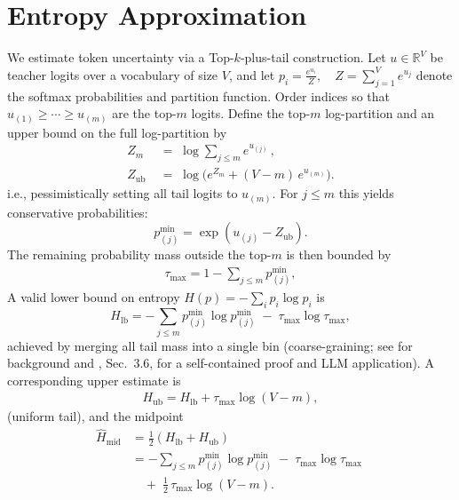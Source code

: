 \documentclass[11pt]{article}
\begin{document}
\section{Entropy Approximation}
\label{sec:entropy}
We estimate token uncertainty via a Top-$k$-plus-tail construction. Let $u \in \mathbb{R}^V$ be teacher logits over a vocabulary of size $V$, and let
$
	p_i=\frac{e^{u_i}}{Z},\quad Z=\sum_{j=1}^V e^{u_j}
$
denote the softmax probabilities and partition function. Order indices so that $u_{(1)} \geq \cdots \geq u_{(m)}$ are the top-$m$ logits. Define the top-$m$ log-partition and an upper bound on the full log-partition by
\begin{align*}
	Z_m \;           & =\; \log \sum_{j \leq m} e^{u_{(j)}}\,,          \\
	Z_{\text{ub}} \; & =\; \log\Big(e^{Z_m} + (V-m)\,e^{u_{(m)}}\Big).
\end{align*}
i.e., pessimistically setting all tail logits to $u_{(m)}$. For $j\le m$ this yields conservative probabilities:
\[
	p^{\min}_{(j)}=\exp(u_{(j)}-Z_{\text{ub}}).
\]
The remaining probability mass outside the top-$m$ is then bounded by
\begin{align*}
	\tau_{\max}=1-\sum_{j\le m}p^{\min}_{(j)},
\end{align*}
A valid lower bound on entropy $H(p)=-\sum_i p_i\log p_i$ is
\[
	H_{\text{lb}}=-\sum_{j\le m} p^{\min}_{(j)}\log p^{\min}_{(j)}\;-\;\tau_{\max}\log\tau_{\max},
\]
achieved by merging all tail mass into a single bin (coarse-graining; see \citep{cover2006elements} for background and \citep{kaltchenko2025entropyheatmap}, Sec.~3.6, for a self-contained proof and LLM application). A corresponding upper estimate is
\begin{align*}
	H_{\text{ub}}=H_{\text{lb}}+\tau_{\max}\log(V-m),
\end{align*}
(uniform tail), and the midpoint
\begin{align*}
	\widehat{H}_{\text{mid}} & =\tfrac12\!\left(H_{\text{lb}}+H_{\text{ub}}\right)                                   \\
	                         & = -\sum_{j\le m}p^{\min}_{(j)}\log p^{\min}_{(j)} \;-\; \tau_{\max}\log\tau_{\max} \; \\
	                         & \quad +\; \tfrac12\,\tau_{\max}\log(V-m).
\end{align*}
\end{document}
